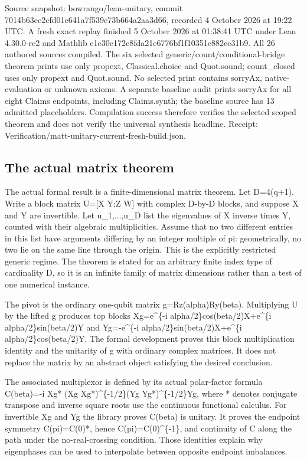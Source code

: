 \documentclass[11pt,a4paper]{article}
\begin{document}
Source snapshot: bowrango/lean-unitary, commit 7014b63ee2cfd01c641a7f539c73b664a2aa3d66, recorded 4 October 2026 at 19:22 UTC. A fresh exact replay finished 5 October 2026 at 01:38:41 UTC under Lean 4.30.0-rc2 and Mathlib c1e30e172c8fda21e6776bf1f10351e882ee31b9. All 26 authored sources compiled. The six selected generic/count/conditional-bridge theorem prints use only propext, Classical.choice and Quot.sound; count\_closed uses only propext and Quot.sound. No selected print contains sorryAx, native-evaluation or unknown axioms. A separate baseline audit prints sorryAx for all eight Claims endpoints, including Claims.synth; the baseline source has 13 admitted placeholders. Compilation success therefore verifies the selected scoped theorem and does not verify the universal synthesis headline. Receipt: Verification/matt-unitary-current-fresh-build.json.

\subsection{The actual matrix theorem}
The actual formal result is a finite-dimensional matrix theorem. Let D=4(q+1). Write a block matrix U=[X Y;Z W] with complex D-by-D blocks, and suppose X and Y are invertible. Let u\_1,...,u\_D list the eigenvalues of X inverse times Y, counted with their algebraic multiplicities. Assume that no two different entries in this list have arguments differing by an integer multiple of pi: geometrically, no two lie on the same line through the origin. This is the explicitly restricted generic regime. The theorem is stated for an arbitrary finite index type of cardinality D, so it is an infinite family of matrix dimensions rather than a test of one numerical instance.

The pivot is the ordinary one-qubit matrix g=Rz(alpha)Ry(beta). Multiplying U by the lifted g produces top blocks Xg=e\textasciicircum{}\{-i alpha/2\}cos(beta/2)X+e\textasciicircum{}\{i alpha/2\}sin(beta/2)Y and Yg=-e\textasciicircum{}\{-i alpha/2\}sin(beta/2)X+e\textasciicircum{}\{i alpha/2\}cos(beta/2)Y. The formal development proves this block multiplication identity and the unitarity of g with ordinary complex matrices. It does not replace the matrix by an abstract object satisfying the desired conclusion.

The associated multiplexor is defined by its actual polar-factor formula
C(beta)=-i Xg* (Xg Xg*)\textasciicircum{}\{-1/2\}(Yg Yg*)\textasciicircum{}\{-1/2\}Yg,
where * denotes conjugate transpose and inverse square roots use the continuous functional calculus. For invertible Xg and Yg the library proves C(beta) is unitary. It proves the endpoint symmetry C(pi)=C(0)*, hence C(pi)=C(0)\textasciicircum{}\{-1\}, and continuity of C along the path under the no-real-crossing condition. Those identities explain why eigenphases can be used to interpolate between opposite endpoint imbalances.
\end{document}
